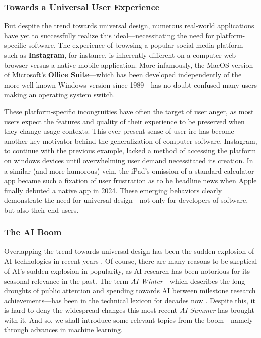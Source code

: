\documentclass{report}
\newcommand{\tech}[1]{\textbf{#1}}
\begin{document}
\subsubsection{Towards a Universal User Experience}
But despite the trend towards universal design, numerous real-world applications have yet to successfully realize this ideal---necessitating the need for platform-specific software. The experience of browsing a popular social media platform such as \tech{Instagram}, for instance, is inherently different on a computer web browser versus a native mobile application. More infamously, the MacOS version of Microsoft's \tech{Office Suite}---which has been developed independently of the more well known Windows version since 1989---has no doubt confused many users making an operating system switch.

These platform-specific incongruities have often the target of user anger\cite{Paquin_2010}, as most users expect the features and quality of their experience to be preserved when they change usage contexts. This ever-present sense of user ire has become another key motivator behind the generalization of computer software. Instagram, to continue with the previous example, lacked a method of accessing the platform on windows devices until overwhelming user demand necessitated its creation\cite{Warren2013}. In a similar (and more humorous) vein, the iPad's omission of a standard calculator app became such a fixation of user frustration as to be headline news \cite{Weinstein_2024} when Apple finally debuted a native app in 2024. These emerging behaviors clearly demonstrate the need for universal design---not only for developers of software, but also their end-users. 

\subsubsection{The AI Boom}
Overlapping the trend towards universal design has been the sudden explosion of AI technologies in recent years \cite{Knight_2023}. Of course, there are many reasons to be skeptical of AI's sudden explosion in popularity, as AI research has been notorious for its seasonal relevance in the past. The term \emph{AI Winter}---which describes the long droughts of public attention and spending towards AI between milestone research achievements---has been in the technical lexicon for decades now \cite{AIWinter}. Despite this, it is hard to deny the widespread changes this most recent \emph{AI Summer} has brought with it. And so, we shall introduce some relevant topics from the boom---namely through advances in machine learning. 
\end{document}
